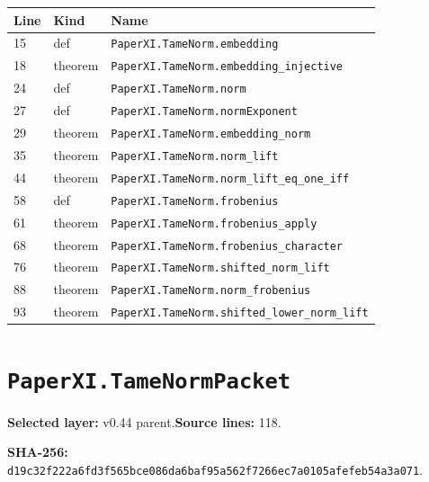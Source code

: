 \documentclass[10pt,oneside]{book}
\begin{document}
\begin{longtable}{@{}p{}p{}p{}@{}}\toprule Line&Kind&Name\\\midrule\endhead

15&def&\nolinkurl{PaperXI.TameNorm.embedding}\\

18&theorem&\nolinkurl{PaperXI.TameNorm.embedding_injective}\\

24&def&\nolinkurl{PaperXI.TameNorm.norm}\\

27&def&\nolinkurl{PaperXI.TameNorm.normExponent}\\

29&theorem&\nolinkurl{PaperXI.TameNorm.embedding_norm}\\

35&theorem&\nolinkurl{PaperXI.TameNorm.norm_lift}\\

44&theorem&\nolinkurl{PaperXI.TameNorm.norm_lift_eq_one_iff}\\

58&def&\nolinkurl{PaperXI.TameNorm.frobenius}\\

61&theorem&\nolinkurl{PaperXI.TameNorm.frobenius_apply}\\

68&theorem&\nolinkurl{PaperXI.TameNorm.frobenius_character}\\

76&theorem&\nolinkurl{PaperXI.TameNorm.shifted_norm_lift}\\

88&theorem&\nolinkurl{PaperXI.TameNorm.norm_frobenius}\\

93&theorem&\nolinkurl{PaperXI.TameNorm.shifted_lower_norm_lift}\\

\bottomrule\end{longtable}

\section{\texorpdfstring{\nolinkurl{PaperXI.TameNormPacket}}{PaperXI.TameNormPacket}}\label{module:PaperXI.TameNormPacket}

\textbf{Selected layer:} v0.44 parent.\quad\textbf{Source lines:} 118.\par\textbf{SHA-256:} {\scriptsize\nolinkurl{d19c32f222a6fd3f565bce086da6baf95a562f7266ec7a0105afefeb54a3a071}}.
\end{document}
